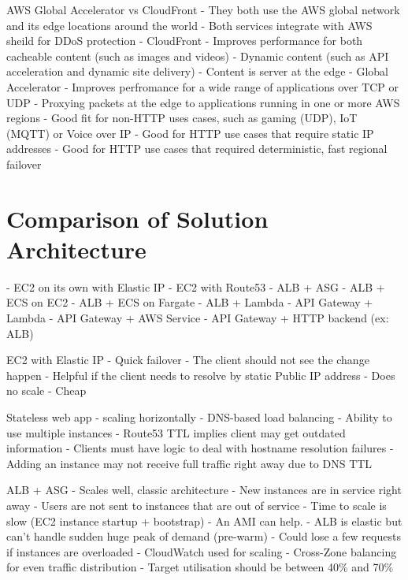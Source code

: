 \documentclass[11pt]{book}
\begin{document}
    AWS Global Accelerator vs CloudFront
    - They both use the AWS global network and its edge locations around the world
    - Both services integrate with AWS sheild for DDoS protection
    - CloudFront
        - Improves performance for both cacheable content (such as images and videos)
        - Dynamic content (such as API acceleration and dynamic site delivery)
        - Content is server at the edge
    - Global Accelerator
        - Improves perfromance for a wide range of applications over TCP or UDP
        - Proxying packets at the edge to applications running in one or more AWS regions
        - Good fit for non-HTTP uses cases, such as gaming (UDP), IoT (MQTT) or Voice over IP
        - Good for HTTP use cases that require static IP addresses
        - Good for HTTP use cases that required deterministic, fast regional failover

    \section{Comparison of Solution Architecture}
    - EC2 on its own with Elastic IP
    - EC2 with Route53
    - ALB + ASG
    - ALB + ECS on EC2
    - ALB + ECS on Fargate
    - ALB + Lambda
    - API Gateway + Lambda
    - API Gateway + AWS Service
    - API Gateway + HTTP backend (ex: ALB)

    EC2 with Elastic IP
    - Quick failover
    - The client should not see the change happen
    - Helpful if the client needs to resolve by static Public IP address
    - Does no scale
    - Cheap

    Stateless web app - scaling horizontally
    - DNS-based load balancing
    - Ability to use multiple instances
    - Route53 TTL implies client may get outdated information
    - Clients must have logic to deal with hostname resolution failures
    - Adding an instance may not receive full traffic right away due to DNS TTL

    ALB + ASG
    - Scales well, classic architecture
    - New instances are in service right away
    - Users are not sent to instances that are out of service
    - Time to scale is slow (EC2 instance startup + bootstrap) - An AMI can help.
    - ALB is elastic but can't handle sudden huge peak of demand (pre-warm)
    - Could lose a few requests if instances are overloaded
    - CloudWatch used for scaling
    - Cross-Zone balancing for even traffic distribution
    - Target utilisation should be between 40\% and 70\%
\end{document}
